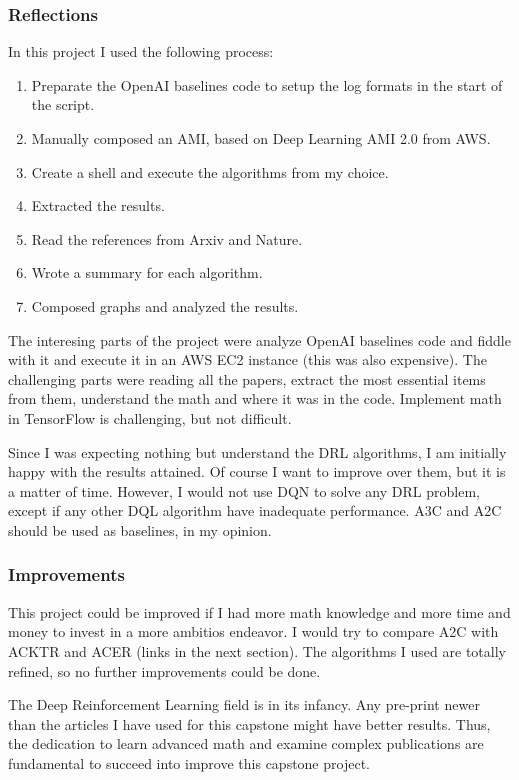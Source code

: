 \documentclass[11pt,twoside,a4paper]{article}
\begin{document}
\subsubsection*{Reflections}

In this project I used the following process:

\begin{enumerate}
  \item Preparate the OpenAI baselines code to setup the log formats in the
  start of the script.
  \item Manually composed an AMI, based on Deep Learning AMI 2.0 from AWS.
  \item Create a shell and execute the algorithms from my choice.
  \item Extracted the results.
  \item Read the references from Arxiv and Nature.
  \item Wrote a summary for each algorithm.
  \item Composed graphs and analyzed the results.
\end{enumerate}

The interesing parts of the project were analyze OpenAI baselines code and
fiddle with it and execute it in an AWS EC2 instance (this was also expensive).
The challenging parts were reading all the papers, extract the most essential
items from them, understand the math and where it was in the code. Implement
math in TensorFlow is challenging, but not difficult.

Since I was expecting nothing but understand the DRL algorithms, I am initially
happy with the results attained. Of course I want to improve over them, but it
is a matter of time. However, I would not use DQN to solve any DRL problem,
except if any other DQL algorithm have inadequate performance. A3C and A2C
should be used as baselines, in my opinion.

\subsubsection*{Improvements}

This project could be improved if I had more math knowledge and more time and
money to invest in a more ambitios endeavor. I would try to compare A2C with
ACKTR and ACER (links in the next section). The algorithms I used are totally
refined, so no further improvements could be done.

The Deep Reinforcement Learning field is in its infancy. Any pre-print newer
than the articles I have used for this capstone might have better results. Thus,
the dedication to learn advanced math and examine complex publications are
fundamental to succeed into improve this capstone project.
\end{document}
